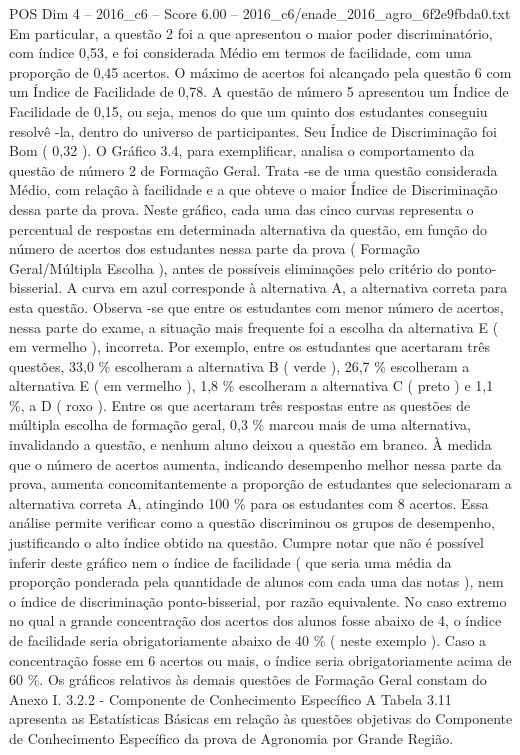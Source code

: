 \begin{textsample}{POS Dim 4 – 2016\_c6 – Score 6.00 – 2016\_c6/enade\_2016\_agro\_6f2e9fbda0.txt}
Em particular, a questão 2 foi a que apresentou o maior poder discriminatório, com índice 0,53, e foi considerada Médio em termos de facilidade, com uma proporção de 0,45 acertos.
O máximo de acertos foi alcançado pela questão 6 com um Índice de Facilidade de 0,78.
A questão de número 5 apresentou um Índice de Facilidade de 0,15, ou seja, menos do que um quinto dos estudantes conseguiu resolvê -la, dentro do universo de participantes.
Seu Índice de Discriminação foi Bom ( 0,32 ).
O Gráfico 3.4, para exemplificar, analisa o comportamento da questão de número 2 de Formação Geral.
Trata -se de uma questão considerada Médio, com relação à facilidade e a que obteve o maior Índice de Discriminação dessa parte da prova.
Neste gráfico, cada uma das cinco curvas representa o percentual de respostas em determinada alternativa da questão, em função do número de acertos dos estudantes nessa parte da prova ( Formação Geral/Múltipla Escolha ), antes de possíveis eliminações pelo critério do ponto-bisserial.
A curva em azul corresponde à alternativa A, a alternativa correta para esta questão.
Observa -se que entre os estudantes com menor número de acertos, nessa parte do exame, a situação mais frequente foi a escolha da alternativa E ( em vermelho ), incorreta.
Por exemplo, entre os estudantes que acertaram três questões, 33,0 \% escolheram a alternativa B ( verde ), 26,7 \% escolheram a alternativa E ( em vermelho ), 1,8 \% escolheram a alternativa C ( preto ) e 1,1 \%, a D ( roxo ).
Entre os que acertaram três respostas entre as questões de múltipla escolha de formação geral, 0,3 \% marcou mais de uma alternativa, invalidando a questão, e nenhum aluno deixou a questão em branco.
À medida que o número de acertos aumenta, indicando desempenho melhor nessa parte da prova, aumenta concomitantemente a proporção de estudantes que selecionaram a alternativa correta A, atingindo 100 \% para os estudantes com 8 acertos.
Essa análise permite verificar como a questão discriminou os grupos de desempenho, justificando o alto índice obtido na questão.
Cumpre notar que não é possível inferir deste gráfico nem o índice de facilidade ( que seria uma média da proporção ponderada pela quantidade de alunos com cada uma das notas ), nem o índice de discriminação ponto-bisserial, por razão equivalente.
No caso extremo no qual a grande concentração dos acertos dos alunos fosse abaixo de 4, o índice de facilidade seria obrigatoriamente abaixo de 40 \% ( neste exemplo ).
Caso a concentração fosse em 6 acertos ou mais, o índice seria obrigatoriamente acima de 60 \%.
Os gráficos relativos às demais questões de Formação Geral constam do Anexo I. 3.2.2 - Componente de Conhecimento Específico A Tabela 3.11 apresenta as Estatísticas Básicas em relação às questões objetivas do Componente de Conhecimento Específico da prova de Agronomia por Grande Região.

\end{textsample}
